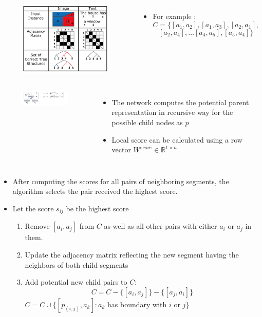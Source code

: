 \documentclass{beamer}
\begin{document}
{
	\begin{columns}
	\begin{figure}[ht]  
		\begin{center}
			\includegraphics[width=2.1in]{images/fig3.png}   
		\end{center}   
	\end{figure}
	\begin{itemize}
		\item For example :
		$$ C = \{[a_1, a_2], [a_1, a_3], [a_2, a_1], $$ 
		$$ [a_2, a_4], \dots  [a_4,a_5], [a_5, a_4]\} $$
	\end{itemize}
	\end{columns}
}
\frame
{
	\begin{columns}
	\column{0.4\textwidth}
	\begin{figure}[ht]  
		\begin{center}
			\includegraphics[width=2.2in]{images/fig4.png}   
		\end{center}   
	\end{figure}
	\column{0.6\textwidth} 
	\begin{itemize}
		\item The network computes the potential 
		parent representation in recursive way for the possible child nodes as $ \textit{p} $
		\item Local score can be calculated using a row vector 
		$ W^{score} \in \mathbb{R}^{1\times n} $
	\end{itemize}
	\end{columns}
}
\frame
{
	\begin{itemize}
		\item After computing the scores for all pairs of neighboring segments, 
		the algorithm selects the pair received the highest score. 
		\item Let the score $s_{ij}$ be the highest score
		\begin{enumerate}
			\item Remove $[a_i, a_j] $ from $C$ as well as all other pairs with 
			either $a_i$ or $a_j$ in them. 
			\item Update the adjacency matrix reflecting the new segment having the neighbors of both child segments
			\item Add potential new child pairs to $C$:
			$$ C = C - \{[a_i,a_j]\} - \{[a_j, a_i]\} $$
			$ C = C \cup \{[p_{(i,j)}, a_k]: a_k $ has boundary with $i$ or $j\}$
		\end{enumerate}
	\end{itemize}
}
\end{document}
